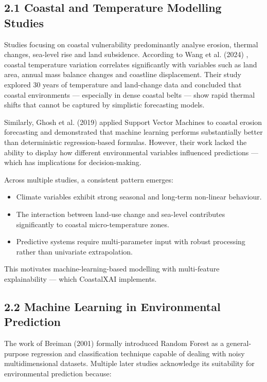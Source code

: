 \documentclass[12pt, a4paper]{article}
\begin{document}
\subsection{\textbf{2.1 Coastal and Temperature Modelling Studies}}

Studies focusing on coastal vulnerability predominantly analyse erosion, thermal changes, sea-level rise and land subsidence. According to Wang et al. (2024) \cite{wang2024}, coastal temperature variation correlates significantly with variables such as land area, annual mass balance changes and coastline displacement. Their study explored 30 years of temperature and land-change data and concluded that coastal environments — especially in dense coastal belts — show rapid thermal shifts that cannot be captured by simplistic forecasting models.

Similarly, Ghosh et al. (2019) \cite{ghosh2019} applied Support Vector Machines to coastal erosion forecasting and demonstrated that machine learning performs substantially better than deterministic regression-based formulas. However, their work lacked the ability to display how different environmental variables influenced predictions — which has implications for decision-making.

Across multiple studies, a consistent pattern emerges:

\begin{itemize}
    \item Climate variables exhibit strong seasonal and long-term non-linear behaviour.
    \item The interaction between land-use change and sea-level contributes significantly to coastal micro-temperature zones.
    \item Predictive systems require multi-parameter input with robust processing rather than univariate extrapolation.
\end{itemize}

This motivates machine-learning-based modelling with multi-feature explainability — which CoastalXAI implements.

\subsection{\textbf{2.2 Machine Learning in Environmental Prediction}}

The work of Breiman (2001) \cite{breiman2001} formally introduced Random Forest as a general-purpose regression and classification technique capable of dealing with noisy multidimensional datasets. Multiple later studies acknowledge its suitability for environmental prediction because:
\end{document}
